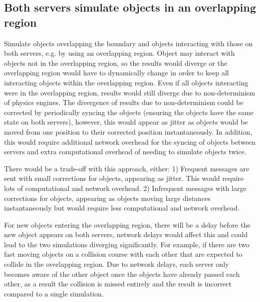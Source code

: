 \subsection{Both servers simulate objects in an overlapping region}
Simulate objects overlapping the boundary and objects interacting with those on both servers, e.g. by using an overlapping region. Object may interact with objects not in the overlapping region, so the results would diverge or the overlapping region would have to dynamically change in order to keep all interacting objects within the overlapping region. Even if all objects interacting were in the overlapping region, results would still diverge due to non-determinism of physics engines. The divergence of results due to non-determinism could be corrected by periodically syncing the objects (ensuring the objects have the same state on both servers), however, this would appear as jitter as objects would be moved from one position to their corrected position instantaneously. In addition, this would require additional network overhead for the syncing of objects between servers and extra computational overhead of needing to simulate objects twice.

There would be a trade-off with this approach, either:
1) Frequent messages are sent with small corrections for objects, appearing as jitter. This would require lots of computational and network overhead. 
2) Infrequent messages with large corrections for objects, appearing as objects moving large distances instantaneously but would require less computational and network overhead.

For new objects entering the overlapping region, there will be a delay before the new object appears on both servers, network delays would affect this and could lead to the two simulations diverging significantly. For example, if there are two fast moving objects on a collision course with each other that are expected to collide in the overlapping region. Due to network delays, each server only becomes aware of the other object once the objects have already passed each other, as a result the collision is missed entirely and the result is incorrect compared to a single simulation.

